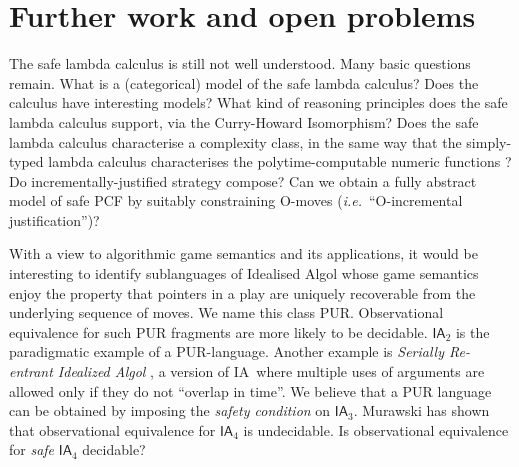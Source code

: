 \documentclass{llncs}
\newcommand\ialgol{\textsf{IA}}
\begin{document}


\section{Further work and open problems}

The safe lambda calculus is still not well understood. Many basic
questions remain. What is a (categorical) model of the safe lambda
calculus? Does the calculus have interesting models?  What kind of
reasoning principles does the safe lambda calculus support, via the
Curry-Howard Isomorphism? Does the safe lambda calculus characterise a
complexity class, in the same way that the simply-typed lambda
calculus characterises the polytime-computable numeric functions
\cite{DBLP:conf/tlca/LeivantM93}?  Do incrementally-justified strategy
compose? Can we obtain a fully abstract model of safe PCF by suitably
constraining O-moves ({\it i.e.}~``O-incremental justification'')?

With a view to algorithmic game semantics and its applications, it
would be interesting to identify sublanguages of Idealised Algol whose
game semantics enjoy the property that pointers in a play are uniquely
recoverable from the underlying sequence of moves. We name this class
PUR. Observational equivalence for such PUR fragments are more likely to be
decidable. $\ialgol_2$ is the paradigmatic example of a
PUR-language. Another example is \emph{Serially Re-entrant Idealized
  Algol} \cite{abramsky:mchecking_ia}, a version of \ialgol\ where
multiple uses of arguments are allowed only if they do not ``overlap
in time''.  We believe that a PUR language can be obtained by imposing
the \emph{safety condition} on $\ialgol_3$. Murawski \cite{Murawski2003} has
shown that observational equivalence for $\ialgol_4$ is
undecidable. Is observational equivalence for \emph{safe} $\ialgol_4$
decidable?

%
%


\end{document}
